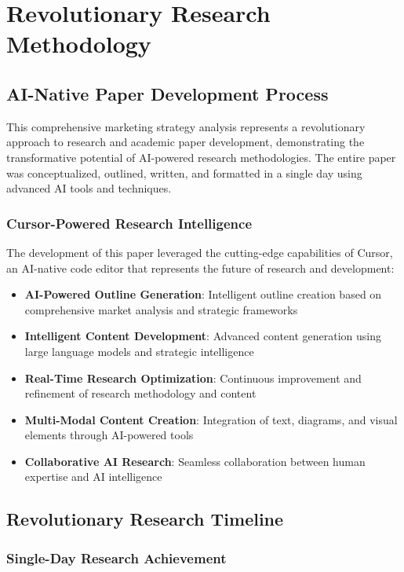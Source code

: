 \documentclass[12pt,a4paper]{book}
\begin{document}
\section{Revolutionary Research Methodology}

\subsection{AI-Native Paper Development Process}

This comprehensive marketing strategy analysis represents a revolutionary approach to research and academic paper development, demonstrating the transformative potential of AI-powered research methodologies. The entire paper was conceptualized, outlined, written, and formatted in a single day using advanced AI tools and techniques.

\subsubsection{Cursor-Powered Research Intelligence}

The development of this paper leveraged the cutting-edge capabilities of Cursor, an AI-native code editor that represents the future of research and development:

\begin{itemize}
    \item \textbf{AI-Powered Outline Generation}: Intelligent outline creation based on comprehensive market analysis and strategic frameworks
    \item \textbf{Intelligent Content Development}: Advanced content generation using large language models and strategic intelligence
    \item \textbf{Real-Time Research Optimization}: Continuous improvement and refinement of research methodology and content
    \item \textbf{Multi-Modal Content Creation}: Integration of text, diagrams, and visual elements through AI-powered tools
    \item \textbf{Collaborative AI Research}: Seamless collaboration between human expertise and AI intelligence
\end{itemize}

\subsection{Revolutionary Research Timeline}

\subsubsection{Single-Day Research Achievement}
\end{document}
